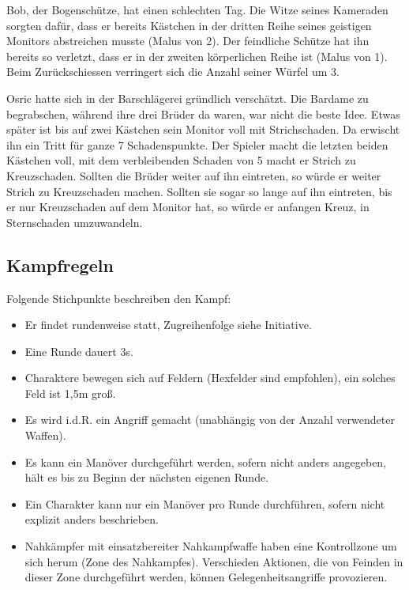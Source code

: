 \documentclass{article}
\begin{document}
Bob, der Bogenschütze, hat einen schlechten Tag. Die Witze seines Kameraden sorgten dafür, dass er bereits Kästchen in
der dritten Reihe seines geistigen Monitors abstreichen musste (Malus von 2). Der feindliche Schütze hat ihn bereits
so verletzt, dass er in der zweiten körperlichen Reihe ist (Malus von 1). Beim Zurückschiessen verringert sich die
Anzahl seiner Würfel um 3.

Osric hatte sich in der Barschlägerei gründlich verschätzt. Die Bardame zu begrabschen, während ihre drei Brüder da
waren, war nicht die beste Idee. Etwas später ist bis auf zwei Kästchen sein Monitor voll mit Strichschaden. Da
erwischt ihn ein Tritt für ganze 7 Schadenspunkte. Der Spieler macht die letzten beiden Kästchen voll, mit dem
verbleibenden Schaden von 5 macht er Strich zu Kreuzschaden. Sollten die Brüder weiter auf ihn eintreten, so würde er
weiter Strich zu Kreuzschaden machen. Sollten sie sogar so lange auf ihn eintreten, bis er nur Kreuzschaden auf dem
Monitor hat, so würde er anfangen Kreuz, in Sternschaden umzuwandeln.

\begin{center}
\subsection{Kampfregeln}
\end{center}

Folgende Stichpunkte beschreiben den Kampf:

\begin{itemize}
\item Er findet rundenweise statt, Zugreihenfolge siehe Initiative.
\item Eine Runde dauert 3s.
\item Charaktere bewegen sich auf Feldern (Hexfelder sind empfohlen), ein solches Feld ist 1,5m groß.
\item Es wird i.d.R. ein Angriff gemacht (unabhängig von der Anzahl verwendeter Waffen).
\item Es kann ein Manöver durchgeführt werden, sofern nicht anders angegeben, hält es bis zu Beginn der nächsten eigenen Runde.
\item Ein Charakter kann nur ein Manöver pro Runde durchführen, sofern nicht explizit anders beschrieben.
\item Nahkämpfer mit einsatzbereiter Nahkampfwaffe haben eine Kontrollzone um sich herum (Zone des Nahkampfes). Verschieden Aktionen, die von Feinden in dieser Zone durchgeführt werden, können Gelegenheitsangriffe provozieren.
\end{itemize}
\end{document}
